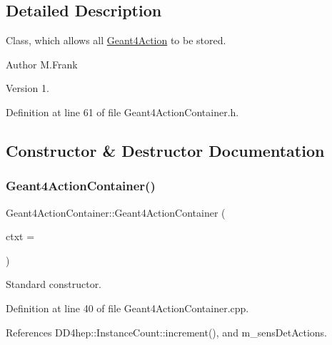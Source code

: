 \subsection{Detailed Description}
Class, which allows all \hyperlink{class_d_d4hep_1_1_simulation_1_1_geant4_action}{Geant4\+Action} to be stored. 

\begin{DoxyAuthor}{Author}
M.\+Frank 
\end{DoxyAuthor}
\begin{DoxyVersion}{Version}
1. 
\end{DoxyVersion}


Definition at line 61 of file Geant4\+Action\+Container.\+h.



\subsection{Constructor \& Destructor Documentation}
\hypertarget{class_d_d4hep_1_1_simulation_1_1_geant4_action_container_aad45b121ff08648b1eaf84869ad33da7}{}\label{class_d_d4hep_1_1_simulation_1_1_geant4_action_container_aad45b121ff08648b1eaf84869ad33da7} 
\subsubsection{\texorpdfstring{Geant4\+Action\+Container()}{Geant4ActionContainer()}}
{\footnotesize\ttfamily Geant4\+Action\+Container\+::\+Geant4\+Action\+Container (\begin{DoxyParamCaption}\item[{\hyperlink{class_d_d4hep_1_1_simulation_1_1_geant4_context}{Geant4\+Context} $\ast$}]{ctxt = {} }\end{DoxyParamCaption})\hspace{0.3cm}{\ttfamily [protected]}}



Standard constructor. 



Definition at line 40 of file Geant4\+Action\+Container.\+cpp.



References D\+D4hep\+::\+Instance\+Count\+::increment(), and m\+\_\+sens\+Det\+Actions.

